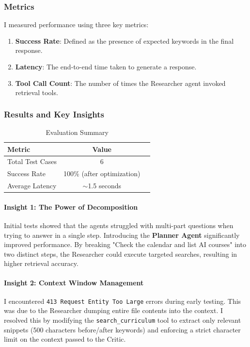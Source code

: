 \subsubsection{Metrics}
I measured performance using three key metrics:
\begin{enumerate}
    \item \textbf{Success Rate}: Defined as the presence of expected keywords in the final response.
    \item \textbf{Latency}: The end-to-end time taken to generate a response.
    \item \textbf{Tool Call Count}: The number of times the Researcher agent invoked retrieval tools.
\end{enumerate}

\subsubsection{Results and Key Insights}

\begin{table}[H]
\centering
\begin{tabular}{|l|c|c|}
\hline
\textbf{Metric} & \textbf{Value} \\
\hline
Total Test Cases & 6 \\
Success Rate & 100\% (after optimization) \\
Average Latency & $\sim$1.5 seconds \\
\hline
\end{tabular}
\caption{Evaluation Summary}
\label{tab:results}
\end{table}

\paragraph{Insight 1: The Power of Decomposition}
Initial tests showed that the agents struggled with multi-part questions when trying to answer in a single step. Introducing the \textbf{Planner Agent} significantly improved performance. By breaking "Check the calendar and list AI courses" into two distinct steps, the Researcher could execute targeted searches, resulting in higher retrieval accuracy.

\paragraph{Insight 2: Context Window Management}
I encountered \texttt{413 Request Entity Too Large} errors during early testing. This was due to the Researcher dumping entire file contents into the context. I resolved this by modifying the \texttt{search\_curriculum} tool to extract only relevant snippets (500 characters before/after keywords) and enforcing a strict character limit on the context passed to the Critic.

